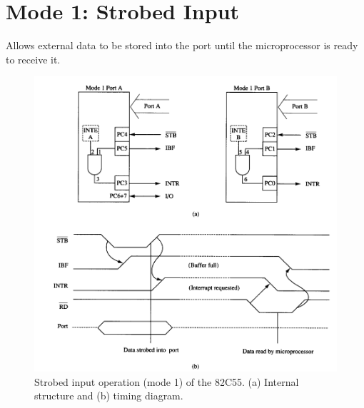 \section{Mode 1: Strobed Input}
Allows external data to be stored into the port until the microprocessor is ready to receive it.
\begin{figure}[h!]
  \centering
  \includegraphics[width = 1.2\textwidth]{./figures/Mode_1.png}
  \caption{Strobed input operation (mode 1) of the 82C55. (a) Internal structure and (b) timing diagram.}
\end{figure}

